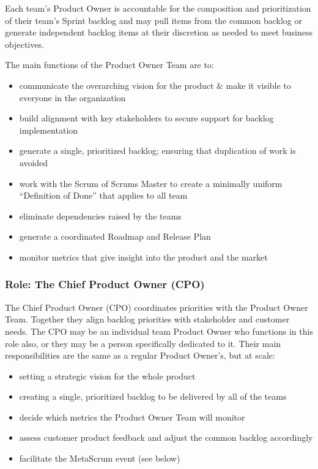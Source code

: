 \documentclass[12pt,a4paper,parskip=full]{scrartcl}
\begin{document}
Each team's Product Owner is accountable for the composition and
prioritization of their team's Sprint backlog and may pull items from
the common backlog or generate independent backlog items at their
discretion as needed to meet business objectives.

The main functions of the Product Owner Team are to:

\begin{itemize}
\itemsep1pt\parskip0pt
\item
  communicate the overarching vision for the product \& make it visible
  to everyone in the organization
\item
  build alignment with key stakeholders to secure support for backlog
  implementation
\item
  generate a single, prioritized backlog; ensuring that duplication of
  work is avoided
\item
  work with the Scrum of Scrums Master to create a minimally uniform
  ``Definition of Done'' that applies to all team
\item
  eliminate dependencies raised by the teams
\item
  generate a coordinated Roadmap and Release Plan
\item
  monitor metrics that give insight into the product and the market
\end{itemize}

\subsubsection{Role: The Chief Product Owner
(CPO)}\label{role-the-chief-product-owner}

The Chief Product Owner (CPO) coordinates priorities with the Product
Owner Team. Together they align backlog priorities with stakeholder and
customer needs. The CPO may be an individual team Product Owner who
functions in this role also, or they may be a person specifically
dedicated to it. Their main responsibilities are the same as a regular
Product Owner's, but at scale:

\begin{itemize}
\itemsep1pt\parskip0pt
\item
  setting a strategic vision for the whole product
\item
  creating a single, prioritized backlog to be delivered by all of the
  teams
\item
  decide which metrics the Product Owner Team will monitor
\item
  assess customer product feedback and adjust the common backlog
  accordingly
\item
  facilitate the MetaScrum event (see below)
\end{itemize}
\end{document}
